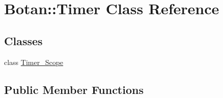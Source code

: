 \hypertarget{class_botan_1_1_timer}{}\section{Botan\+:\+:Timer Class Reference}
\label{class_botan_1_1_timer}
\subsection*{Classes}
\begin{DoxyCompactItemize}
\item 
class \mbox{\hyperlink{class_botan_1_1_timer_1_1_timer___scope}{Timer\+\_\+\+Scope}}
\end{DoxyCompactItemize}
\subsection*{Public Member Functions}
